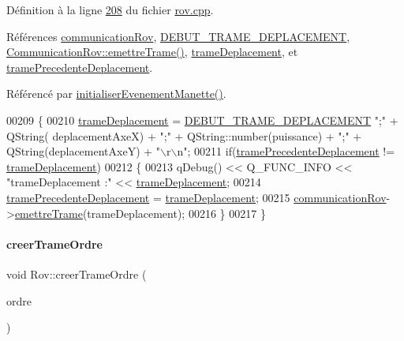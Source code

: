 Définition à la ligne \hyperlink{rov_8cpp_source_l00208}{208} du fichier \hyperlink{rov_8cpp_source}{rov.\+cpp}.



Références \hyperlink{rov_8h_source_l00097}{communication\+Rov}, \hyperlink{rov_8h_source_l00034}{D\+E\+B\+U\+T\+\_\+\+T\+R\+A\+M\+E\+\_\+\+D\+E\+P\+L\+A\+C\+E\+M\+E\+NT}, \hyperlink{communicationrov_8cpp_source_l00060}{Communication\+Rov\+::emettre\+Trame()}, \hyperlink{rov_8h_source_l00100}{trame\+Deplacement}, et \hyperlink{rov_8h_source_l00101}{trame\+Precedente\+Deplacement}.



Référencé par \hyperlink{rov_8cpp_source_l00052}{initialiser\+Evenement\+Manette()}.


\begin{DoxyCode}
00209 \{
00210     \hyperlink{class_rov_ad30a06154c31cdb02eb28a0c7197731f}{trameDeplacement} = \hyperlink{rov_8h_a5bebf7c0b48103d44a372f28cf7f8981}{DEBUT\_TRAME\_DEPLACEMENT} \textcolor{stringliteral}{";"} + QString(
      deplacementAxeX) + \textcolor{stringliteral}{";"} + QString::number(puissance) + \textcolor{stringliteral}{";"} + QString(deplacementAxeY) + \textcolor{stringliteral}{"\(\backslash\)r\(\backslash\)n"};
00211     \textcolor{keywordflow}{if}(\hyperlink{class_rov_a6e42b166c837f5103b53bb9eae35f087}{tramePrecedenteDeplacement} != \hyperlink{class_rov_ad30a06154c31cdb02eb28a0c7197731f}{trameDeplacement})
00212     \{
00213         qDebug() << Q\_FUNC\_INFO << \textcolor{stringliteral}{"trameDeplacement :"} << \hyperlink{class_rov_ad30a06154c31cdb02eb28a0c7197731f}{trameDeplacement};
00214         \hyperlink{class_rov_a6e42b166c837f5103b53bb9eae35f087}{tramePrecedenteDeplacement} = \hyperlink{class_rov_ad30a06154c31cdb02eb28a0c7197731f}{trameDeplacement};
00215         \hyperlink{class_rov_a8e7aaa17ee2134f26d57241d11ab2a99}{communicationRov}->\hyperlink{class_communication_rov_a4f52076db8d6e78abe1745fa1e235272}{emettreTrame}(trameDeplacement);
00216     \}
00217 \}
\end{DoxyCode}
\mbox{\label{class_rov_a9e80eccfada890561e8af1f3426f6a2b}} 
\paragraph{\texorpdfstring{creer\+Trame\+Ordre}{creerTrameOrdre}}
{\footnotesize\ttfamily void Rov\+::creer\+Trame\+Ordre (\begin{DoxyParamCaption}\item[{Q\+String}]{ordre }\end{DoxyParamCaption})\hspace{0.3cm}{\ttfamily [slot]}}



